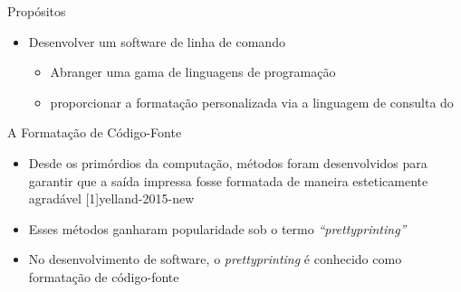 \documentclass
  [ aspectratio=169,
    english,
    hyperref={citecolor=blue,colorlinks=true,linkcolor=blue,urlcolor=blue},
    brazil]
  {beamer}
\begin{document}
  \begin{frame}{Propósitos}
    \begin{itemize}
      \item<2-> Desenvolver um software de linha de comando%
                \begin{itemize}
                  \item<6-> Abranger uma gama de linguagens de programação
                  \item<7-> proporcionar a formatação personalizada via a
                            linguagem de consulta do \treesitter
                \end{itemize}
    \end{itemize}
  \end{frame}


  \begin{frame}{A Formatação de Código-Fonte}
    \begin{itemize}
      \item<2-> Desde os primórdios da computação, métodos foram
                desenvolvidos para garantir que a saída impressa fosse
                formatada de maneira esteticamente agradável
                [1]{yelland-2015-new}
      \item<3-> Esses métodos ganharam popularidade sob o termo
                \textit{``prettyprinting''}
      \item<4-> No desenvolvimento de software, o \textit{prettyprinting} é
                conhecido como formatação de código-fonte
    \end{itemize}
  \end{frame}
\end{document}
